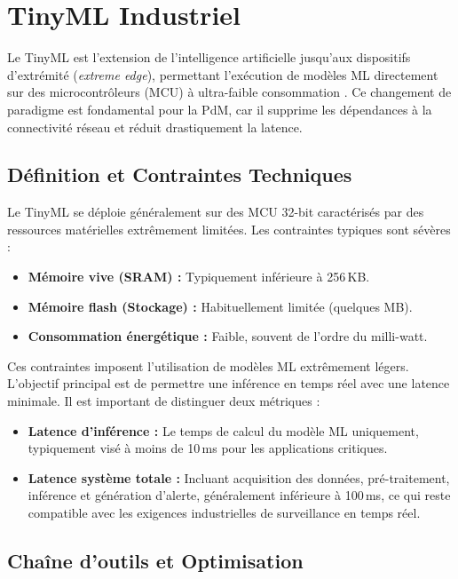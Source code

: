\section{TinyML Industriel}
\label{sec:tinyml_industriel}

Le TinyML est l'extension de l'intelligence artificielle jusqu'aux dispositifs d'extrémité (\textit{extreme edge}), permettant l'exécution de modèles ML directement sur des microcontrôleurs (MCU) à ultra-faible consommation \cite{tsoukas2024,njor2024}. Ce changement de paradigme est fondamental pour la PdM, car il supprime les dépendances à la connectivité réseau et réduit drastiquement la latence.

\subsection{Définition et Contraintes Techniques}

Le TinyML se déploie généralement sur des MCU 32-bit caractérisés par des ressources matérielles extrêmement limitées. Les contraintes typiques sont sévères :
\begin{itemize}
\item \textbf{Mémoire vive (SRAM) :} Typiquement inférieure à 256\,KB.
\item \textbf{Mémoire flash (Stockage) :} Habituellement limitée (quelques MB).
\item \textbf{Consommation énergétique :} Faible, souvent de l'ordre du milli-watt.
\end{itemize}

Ces contraintes imposent l'utilisation de modèles ML extrêmement légers. L'objectif principal est de permettre une inférence en temps réel avec une latence minimale. Il est important de distinguer deux métriques :
\begin{itemize}
\item \textbf{Latence d'inférence :} Le temps de calcul du modèle ML uniquement, typiquement visé à moins de 10\,ms pour les applications critiques.
\item \textbf{Latence système totale :} Incluant acquisition des données, pré-traitement, inférence et génération d'alerte, généralement inférieure à 100\,ms, ce qui reste compatible avec les exigences industrielles de surveillance en temps réel.
\end{itemize}

\subsection{Chaîne d'outils et Optimisation}

